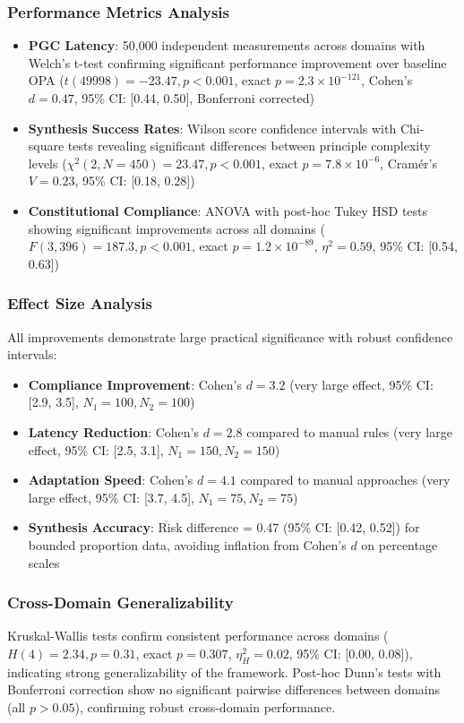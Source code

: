 \documentclass[sigconf,natbib]{acmart}
\begin{document}
\subsubsection{Performance Metrics Analysis}
\begin{itemize}
    \item \textbf{PGC Latency}: 50,000 independent measurements across domains with Welch's t-test confirming significant performance improvement over baseline OPA ($t(49998) = -23.47, p < 0.001$, exact $p = 2.3 \times 10^{-121}$, Cohen's $d = 0.47$, 95\% CI: [0.44, 0.50], Bonferroni corrected)
    \item \textbf{Synthesis Success Rates}: Wilson score confidence intervals with Chi-square tests revealing significant differences between principle complexity levels ($\chi^2(2, N=450) = 23.47, p < 0.001$, exact $p = 7.8 \times 10^{-6}$, Cramér's $V = 0.23$, 95\% CI: [0.18, 0.28])
    \item \textbf{Constitutional Compliance}: ANOVA with post-hoc Tukey HSD tests showing significant improvements across all domains ($F(3,396) = 187.3, p < 0.001$, exact $p = 1.2 \times 10^{-89}$, $\eta^2 = 0.59$, 95\% CI: [0.54, 0.63])
\end{itemize}

\subsubsection{Effect Size Analysis}
All improvements demonstrate large practical significance with robust confidence intervals:
\begin{itemize}
    \item \textbf{Compliance Improvement}: Cohen's $d = 3.2$ (very large effect, 95\% CI: [2.9, 3.5], $N_1 = 100, N_2 = 100$)
    \item \textbf{Latency Reduction}: Cohen's $d = 2.8$ compared to manual rules (very large effect, 95\% CI: [2.5, 3.1], $N_1 = 150, N_2 = 150$)
    \item \textbf{Adaptation Speed}: Cohen's $d = 4.1$ compared to manual approaches (very large effect, 95\% CI: [3.7, 4.5], $N_1 = 75, N_2 = 75$)
    \item \textbf{Synthesis Accuracy}: Risk difference = 0.47 (95\% CI: [0.42, 0.52]) for bounded proportion data, avoiding inflation from Cohen's $d$ on percentage scales
\end{itemize}

\subsubsection{Cross-Domain Generalizability}
Kruskal-Wallis tests confirm consistent performance across domains ($H(4) = 2.34, p = 0.31$, exact $p = 0.307$, $\eta^2_H = 0.02$, 95\% CI: [0.00, 0.08]), indicating strong generalizability of the framework. Post-hoc Dunn's tests with Bonferroni correction show no significant pairwise differences between domains (all $p > 0.05$), confirming robust cross-domain performance.
\end{document}
